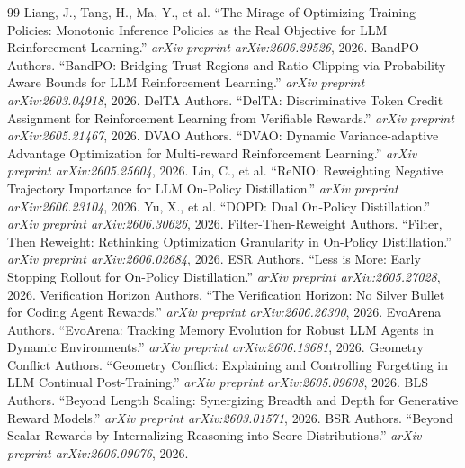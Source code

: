 \documentclass[11pt,a4paper]{article}
\begin{document}
\begin{thebibliography}{99}
 Liang, J., Tang, H., Ma, Y., et al. ``The Mirage of Optimizing Training Policies: Monotonic Inference Policies as the Real Objective for LLM Reinforcement Learning.'' \emph{arXiv preprint arXiv:2606.29526}, 2026.
 BandPO Authors. ``BandPO: Bridging Trust Regions and Ratio Clipping via Probability-Aware Bounds for LLM Reinforcement Learning.'' \emph{arXiv preprint arXiv:2603.04918}, 2026.
 DelTA Authors. ``DelTA: Discriminative Token Credit Assignment for Reinforcement Learning from Verifiable Rewards.'' \emph{arXiv preprint arXiv:2605.21467}, 2026.
 DVAO Authors. ``DVAO: Dynamic Variance-adaptive Advantage Optimization for Multi-reward Reinforcement Learning.'' \emph{arXiv preprint arXiv:2605.25604}, 2026.
 Lin, C., et al. ``ReNIO: Reweighting Negative Trajectory Importance for LLM On-Policy Distillation.'' \emph{arXiv preprint arXiv:2606.23104}, 2026.
 Yu, X., et al. ``DOPD: Dual On-Policy Distillation.'' \emph{arXiv preprint arXiv:2606.30626}, 2026.
 Filter-Then-Reweight Authors. ``Filter, Then Reweight: Rethinking Optimization Granularity in On-Policy Distillation.'' \emph{arXiv preprint arXiv:2606.02684}, 2026.
 ESR Authors. ``Less is More: Early Stopping Rollout for On-Policy Distillation.'' \emph{arXiv preprint arXiv:2605.27028}, 2026.
 Verification Horizon Authors. ``The Verification Horizon: No Silver Bullet for Coding Agent Rewards.'' \emph{arXiv preprint arXiv:2606.26300}, 2026.
 EvoArena Authors. ``EvoArena: Tracking Memory Evolution for Robust LLM Agents in Dynamic Environments.'' \emph{arXiv preprint arXiv:2606.13681}, 2026.
 Geometry Conflict Authors. ``Geometry Conflict: Explaining and Controlling Forgetting in LLM Continual Post-Training.'' \emph{arXiv preprint arXiv:2605.09608}, 2026.
 BLS Authors. ``Beyond Length Scaling: Synergizing Breadth and Depth for Generative Reward Models.'' \emph{arXiv preprint arXiv:2603.01571}, 2026.
 BSR Authors. ``Beyond Scalar Rewards by Internalizing Reasoning into Score Distributions.'' \emph{arXiv preprint arXiv:2606.09076}, 2026.
\end{thebibliography}
\end{document}
